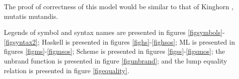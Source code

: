 The proof of correctness of this model would be similar to that of Kinghorn \cite{kinghorn07}, mutatis mutandis.

Legends of symbol and syntax names are presented in figures \ref{figsymbols}-\ref{figsyntax2}; Haskell is presented in figures \ref{fighs}-\ref{fighsos}; ML is presented in figures \ref{figms}-\ref{figmsos}; Scheme is presented in figures \ref{figss}-\ref{figsmos}; the unbrand function is presented in figure \ref{figunbrand}; and the lump equality relation is presented in figure \ref{figequality}.

\clearpage



\clearpage



\clearpage



\clearpage



\clearpage



\clearpage



\clearpage



\clearpage



\clearpage



\clearpage



\clearpage



\clearpage



\clearpage



\clearpage



\clearpage



\clearpage



\clearpage



\clearpage



\clearpage

